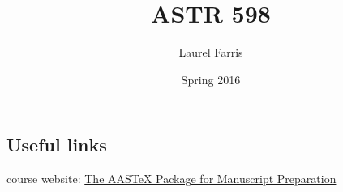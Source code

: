 \documentclass[12pt]{article}
\title{ASTR 598}
\author{Laurel Farris}
\date{Spring 2016}
\begin{document}
\maketitle

\subsection{Useful links}

\noindent course website: \textcolor{blue}
{\href{http://aas.org/aastex/aastex-package-manuscript-preparation}
{The AASTeX Package for Manuscript Preparation}}\\
\end{document}

